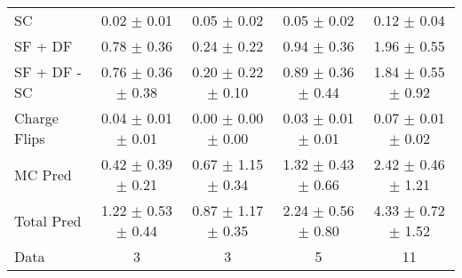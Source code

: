 \begin{tabular}{l|cccc}
                                 SC &  0.02 $\pm$  0.01 &  0.05 $\pm$  0.02 &  0.05 $\pm$  0.02 &  0.12 $\pm$  0.04 \\
                            SF + DF &  0.78 $\pm$  0.36 &  0.24 $\pm$  0.22 &  0.94 $\pm$  0.36 &  1.96 $\pm$  0.55 \\
\hline
                       SF + DF - SC &  0.76 $\pm$  0.36 $\pm$  0.38 &  0.20 $\pm$  0.22 $\pm$  0.10 &  0.89 $\pm$  0.36 $\pm$  0.44 &  1.84 $\pm$  0.55 $\pm$  0.92 \\
\hline\hline
                       Charge Flips &  0.04 $\pm$  0.01 $\pm$  0.01 &  0.00 $\pm$  0.00 $\pm$  0.00 &  0.03 $\pm$  0.01 $\pm$  0.01 &  0.07 $\pm$  0.01 $\pm$  0.02 \\
\hline
                            MC Pred &  0.42 $\pm$  0.39 $\pm$  0.21 &  0.67 $\pm$  1.15 $\pm$  0.34 &  1.32 $\pm$  0.43 $\pm$  0.66 &  2.42 $\pm$  0.46 $\pm$  1.21 \\
\hline
                         Total Pred &  1.22 $\pm$  0.53 $\pm$  0.44 &  0.87 $\pm$  1.17 $\pm$  0.35 &  2.24 $\pm$  0.56 $\pm$  0.80 &  4.33 $\pm$  0.72 $\pm$  1.52 \\
\hline\hline
                               Data &     3 &     3 &     5 &    11 \\
\hline\hline
\end{tabular}

